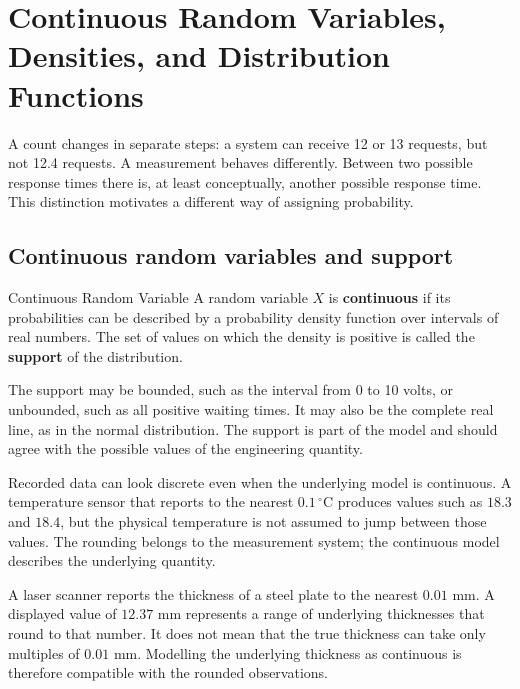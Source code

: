 \section{Continuous Random Variables, Densities, and Distribution Functions}
\label{sec:continuous-foundations}

A count changes in separate steps: a system can receive 12 or 13 requests, but not 12.4 requests. A measurement behaves differently. Between two possible response times there is, at least conceptually, another possible response time. This distinction motivates a different way of assigning probability.

\subsection{Continuous random variables and support}

\begin{definition}{Continuous Random Variable}
A random variable $X$ is \textbf{continuous} if its probabilities can be described by a probability density function over intervals of real numbers. The set of values on which the density is positive is called the \textbf{support} of the distribution.
\end{definition}

The support may be bounded, such as the interval from 0 to 10 volts, or unbounded, such as all positive waiting times. It may also be the complete real line, as in the normal distribution. The support is part of the model and should agree with the possible values of the engineering quantity.

Recorded data can look discrete even when the underlying model is continuous. A temperature sensor that reports to the nearest $0.1\,^{\circ}\mathrm{C}$ produces values such as $18.3$ and $18.4$, but the physical temperature is not assumed to jump between those values. The rounding belongs to the measurement system; the continuous model describes the underlying quantity.

\begin{example}\par
A laser scanner reports the thickness of a steel plate to the nearest $0.01$ mm. A displayed value of $12.37$ mm represents a range of underlying thicknesses that round to that number. It does not mean that the true thickness can take only multiples of $0.01$ mm. Modelling the underlying thickness as continuous is therefore compatible with the rounded observations.
\end{example}

